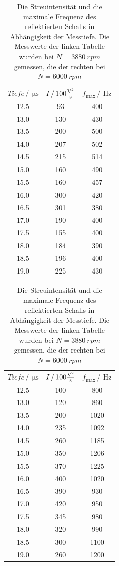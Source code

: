 \begin{table}
    \centering
    \begin{tabular}[t]{ccc}
    \toprule
    $Tiefe \,/\, \SI{}{\micro\second}$ & $I \,/\, \SI{}{100\frac{\volt^2}{\second}} $ & $f_\text{max}\,/\, \SI{}{\Hz} $\\
    12.5 & 93 & 400     \\
    13.0 & 130 & 430    \\
    13.5 & 200 & 500    \\
    14.0 & 207 & 502    \\
    14.5 & 215 & 514    \\
    15.0 & 160 & 490    \\
    15.5 & 160 & 457    \\
    16.0 & 300 & 420    \\
    16.5 & 301 & 380    \\
    17.0 & 190 & 400    \\
    17.5 & 155 & 400    \\
    18.0 & 184 & 390    \\
    18.5 & 196 & 400    \\
    19.0 & 225 & 430    \\
    \bottomrule
    \end{tabular}
    \begin{tabular}[t]{ccc}
    \toprule
    $Tiefe \,/\, \SI{}{\micro\second}$ & $I \,/\, \SI{}{100\frac{\volt ^2}{\second}} $ & $f_\text{max}\,/\, \SI{}{\Hz} $\\
    12.5 & 100 & 800        \\
    13.0 & 120 & 860        \\
    13.5 & 200 & 1020       \\
    14.0 & 235 & 1092       \\
    14.5 & 260 & 1185       \\
    15.0 & 350 & 1206       \\
    15.5 & 370 & 1225       \\
    16.0 & 400 & 1020       \\
    16.5 & 390 & 930        \\
    17.0 & 420 & 950        \\
    17.5 & 345 & 980        \\
    18.0 & 320 & 990        \\
    18.5 & 300 & 1100       \\
    19.0 & 260 & 1200       \\
    \bottomrule
    \end{tabular}
    \caption{Die Streuintensität und die maximale Frequenz des reflektierten Schalls in Abhängigkeit der Messtiefe. Die Messwerte der linken Tabelle wurden bei $N = \SI{3880}{rpm}$ gemessen, die der rechten bei $N = \SI{6000}{rpm}$}
    \label{tab:depth}
\end{table}

